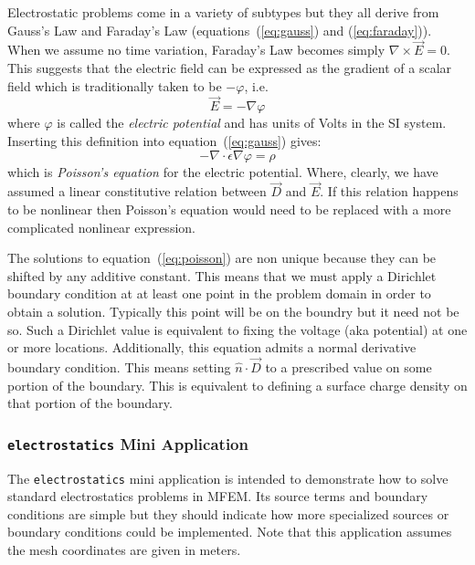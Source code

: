 \documentclass{article}
\newcommand{\refEq}[1]{(\ref{eq:#1})}
\newcommand{\Div}{\nabla\!\cdot\!}
\newcommand{\Curl}{\nabla\!\times\!}
\newcommand{\Grad}{\nabla\!}
\begin{document}
Electrostatic problems come in a variety of subtypes but they all
derive from Gauss's Law and Faraday's Law (equations~\refEq{gauss} and
\refEq{faraday}).  When we assume no time variation, Faraday's Law
becomes simply $\Curl\vec{E}=0$. This suggests that the electric field
can be expressed as the gradient of a scalar field which is
traditionally taken to be $-\varphi$, i.e.
\begin{equation}
\vec{E} = -\Grad\varphi \label{eq:gradphi}
\end{equation}
where $\varphi$ is called the {\em electric potential} and has units
of Volts in the SI system.  Inserting this definition into
equation~\refEq{gauss} gives:
\begin{equation}
-\Div\epsilon\Grad\varphi = \rho \label{eq:poisson}
\end{equation}
which is {\em Poisson's equation} for the electric potential.  Where,
clearly, we have assumed a linear constitutive relation between
$\vec{D}$ and $\vec{E}$.  If this relation happens to be nonlinear
then Poisson's equation would need to be replaced with a more
complicated nonlinear expression.

The solutions to equation~\refEq{poisson} are non unique because they
can be shifted by any additive constant.  This means that we must
apply a Dirichlet boundary condition at at least one point in the
problem domain in order to obtain a solution.  Typically this point
will be on the boundry but it need not be so.  Such a Dirichlet value
is equivalent to fixing the voltage (aka potential) at one or more
locations.  Additionally, this equation admits a normal derivative
boundary condition.  This means setting $\hat{n}\cdot\vec{D}$ to a
prescribed value on some portion of the boundary.  This is equivalent
to defining a surface charge density on that portion of the boundary.

\subsubsection{{\tt electrostatics} Mini Application}

The {\tt electrostatics} mini application is intended to demonstrate
how to solve standard electrostatics problems in MFEM.  Its source
terms and boundary conditions are simple but they should indicate how
more specialized sources or boundary conditions could be implemented.
Note that this application assumes the mesh coordinates are given in
meters.
\end{document}
